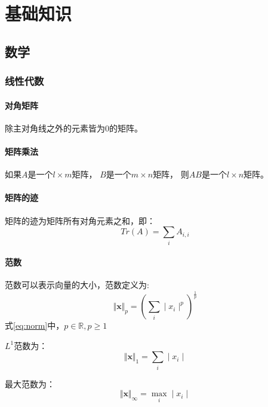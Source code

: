 
\chapter{基础知识}
\section{数学}

\subsection{线性代数}
\subsubsection{对角矩阵}
除主对角线之外的元素皆为{$0$}的矩阵。

\subsubsection{矩阵乘法}
如果{$A$}是一个{$l\times m$}矩阵，
{$B$}是一个{$m\times n$}矩阵，
则{$AB$}是一个{$l\times n$}矩阵。

\subsubsection{矩阵的迹}
矩阵的迹为矩阵所有对角元素之和，即：
\begin{equation}
    \label{eq:matrix_trac}
    Tr(A)=\sum_{i}A_{i,i}
\end{equation}

\subsubsection{范数}
范数可以表示向量的大小，范数定义为:
\begin{equation}
    \label{eq:norm}
    {\Vert \bm{x} \Vert}_{p} = {\left(  \sum_{i} \mid x_i  \mid^p    \right)}^{\frac{1}{p}}
\end{equation}
式{\ref{eq:norm}}中，{$p \in \mathbb{R}, p\geq 1$}

{$L^1$}范数为：
\begin{equation}
    \label{eq:l1_norm}
    \Vert \bm{x} \Vert_{1} =  \sum_{i} \mid x_i \mid
\end{equation}

最大范数为：
\begin{equation}
    \label{eq:max_norm}
    \Vert \bm{x} \Vert_{\infty} = \max_i \mid x_i \mid
\end{equation}


